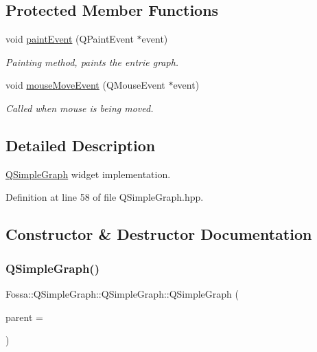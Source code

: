 \subsection*{Protected Member Functions}
\begin{DoxyCompactItemize}
\item 
void \hyperlink{class_fossa_1_1_q_simple_graph_1_1_q_simple_graph_a6559739099820e1303c1dbe2c5757bc4}{paint\+Event} (Q\+Paint\+Event $\ast$event)
\begin{DoxyCompactList}\small\item\em Painting method, paints the entrie graph. \end{DoxyCompactList}\item 
void \hyperlink{class_fossa_1_1_q_simple_graph_1_1_q_simple_graph_a7ae9773902324fc533f0b18294f7c516}{mouse\+Move\+Event} (Q\+Mouse\+Event $\ast$event)
\begin{DoxyCompactList}\small\item\em Called when mouse is being moved. \end{DoxyCompactList}\end{DoxyCompactItemize}


\subsection{Detailed Description}
\hyperlink{class_fossa_1_1_q_simple_graph_1_1_q_simple_graph}{Q\+Simple\+Graph} widget implementation. 

Definition at line 58 of file Q\+Simple\+Graph.\+hpp.



\subsection{Constructor \& Destructor Documentation}
\mbox{\label{class_fossa_1_1_q_simple_graph_1_1_q_simple_graph_ab08b1293b3698e1e179a8d36dc737c77}} 
\subsubsection{\texorpdfstring{Q\+Simple\+Graph()}{QSimpleGraph()}}
{\footnotesize\ttfamily Fossa\+::\+Q\+Simple\+Graph\+::\+Q\+Simple\+Graph\+::\+Q\+Simple\+Graph (\begin{DoxyParamCaption}\item[{Q\+Widget $\ast$}]{parent = {} }\end{DoxyParamCaption})}



